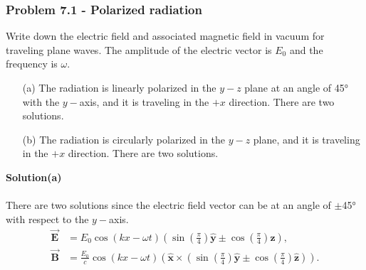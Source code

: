 \documentclass[12pt,a4paper]{article}
\begin{document}
\subsubsection*{Problem 7.1 - Polarized radiation}
Write down the electric field and associated magnetic field in vacuum for traveling plane waves. The amplitude of the electric vector is $E_0$ and the frequency is $\omega$.
\begin{enumerate}
    \item[(a)]The radiation is linearly polarized in the $y-z$ plane at an angle of 45° with the $y-$axis, and it is traveling in the $+x$ direction. There are two solutions.
    \item[(b)]The radiation is circularly polarized in the $y-z$ plane, and it is traveling in the $+x$ direction. There are two solutions.
\end{enumerate}
\textbf{Solution(a)}
\\
\\There are two solutions since the electric field vector can be at an angle of $\pm$45° with respect to the $y-$axis.
\begin{equation}
\begin{aligned}
    \boldsymbol{\Vec{E}} &= E_0\cos(kx-\omega t)\left(\sin\left(\frac{\pi}{4}\right)\boldsymbol{\hat{y}} \pm \cos\left(\frac{\pi}{4}\right)\boldsymbol{\hat{z}}\right), \\
    \boldsymbol{\Vec{B}} &= \frac{E_0}{c}\cos(kx-\omega t)\left(\boldsymbol{\hat{x}}\times\left(\sin\left(\frac{\pi}{4}\right)\boldsymbol{\hat{y}} \pm \cos\left(\frac{\pi}{4}\right)\boldsymbol{\hat{z}}\right)\right).
\end{aligned}
\end{equation}
\end{document}
